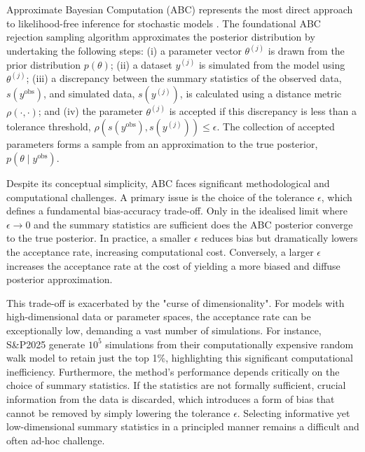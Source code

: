 \documentclass{article}
\begin{document}
Approximate Bayesian Computation (ABC)  represents the most direct approach to likelihood-free inference for stochastic models  \citep{SunnkerABC,Sisson2018}. The foundational ABC rejection sampling algorithm approximates the posterior distribution by undertaking the following steps: (i) a parameter vector $\theta^{(j)}$ is drawn from the prior distribution $p(\theta)$; (ii) a dataset $y^{(j)}$ is simulated from the model using $\theta^{(j)}$; (iii) a discrepancy between the summary statistics of the observed data, $s(y^{\text{obs}})$, and simulated data, $s(y^{(j)})$, is calculated using a distance metric $\rho(\cdot, \cdot)$; and (iv) the parameter $\theta^{(j)}$ is accepted if this discrepancy is less than a tolerance threshold, $\rho(s(y^{\text{obs}}), s(y^{(j)})) \le \epsilon$. The collection of accepted parameters forms a sample from an approximation to the true posterior, $p(\theta \mid y^{\text{obs}})$.


Despite its conceptual simplicity, ABC faces significant methodological and computational challenges. A primary issue is the choice of the tolerance $\epsilon$, which defines a fundamental bias-accuracy trade-off. Only in the idealised limit where $\epsilon \to 0$ and the summary statistics are sufficient does the ABC posterior converge to the true posterior. In practice, a smaller $\epsilon$ reduces bias but dramatically lowers the acceptance rate, increasing computational cost. Conversely, a larger $\epsilon$ increases the acceptance rate at the cost of yielding a more biased and diffuse posterior approximation. 

This trade-off is exacerbated by the "curse of dimensionality". For models with high-dimensional data or parameter spaces, the acceptance rate can be exceptionally low, demanding a vast number of simulations. For instance, S\&P2025 generate $10^5$ simulations from their computationally expensive random walk model to retain just the top 1\%, highlighting this significant computational inefficiency. Furthermore, the method's performance depends critically on the choice of summary statistics. If the statistics are not formally sufficient, crucial information from the data is discarded, which introduces a form of bias that cannot be removed by simply lowering the tolerance $\epsilon$. Selecting informative yet low-dimensional summary statistics in a principled manner remains a difficult and often ad-hoc challenge.
\end{document}
